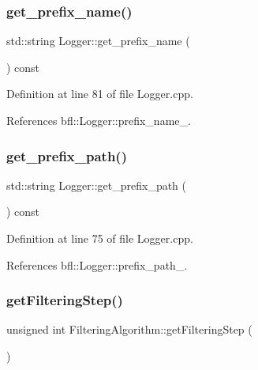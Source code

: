 \subsubsection{\texorpdfstring{get\+\_\+prefix\+\_\+name()}{get\_prefix\_name()}}
{\footnotesize\ttfamily std\+::string Logger\+::get\+\_\+prefix\+\_\+name (\begin{DoxyParamCaption}{ }\end{DoxyParamCaption}) const\hspace{0.3cm}{\ttfamily [inherited]}}



Definition at line 81 of file Logger.\+cpp.



References bfl\+::\+Logger\+::prefix\+\_\+name\+\_\+.

\mbox{\label{classbfl_1_1Logger_a56cf1a4e712bf23d9978420a8a59a62b}} 
\subsubsection{\texorpdfstring{get\+\_\+prefix\+\_\+path()}{get\_prefix\_path()}}
{\footnotesize\ttfamily std\+::string Logger\+::get\+\_\+prefix\+\_\+path (\begin{DoxyParamCaption}{ }\end{DoxyParamCaption}) const\hspace{0.3cm}{\ttfamily [inherited]}}



Definition at line 75 of file Logger.\+cpp.



References bfl\+::\+Logger\+::prefix\+\_\+path\+\_\+.

\mbox{\label{classbfl_1_1FilteringAlgorithm_a8c43b1f3dac30934c0a03de348d4a29d}} 
\subsubsection{\texorpdfstring{get\+Filtering\+Step()}{getFilteringStep()}}
{\footnotesize\ttfamily unsigned int Filtering\+Algorithm\+::get\+Filtering\+Step (\begin{DoxyParamCaption}{ }\end{DoxyParamCaption})}



